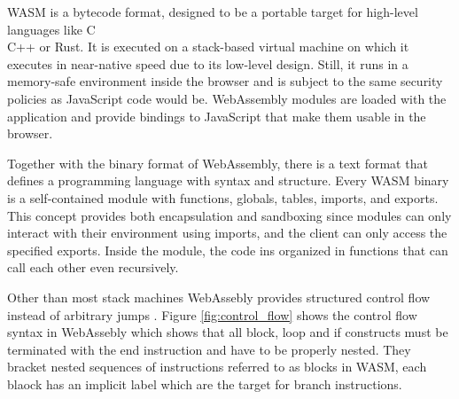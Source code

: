 WASM is a bytecode format, designed to be a portable target for high-level languages like C\\C++ or Rust. It is executed on a stack-based virtual machine on which it executes in near-native speed due to its low-level design. Still, it runs in a memory-safe environment inside the browser and is subject to the same security policies as JavaScript code would be. WebAssembly modules are loaded with the application and provide bindings to JavaScript that make them usable in the browser.

Together with the binary format of WebAssembly, there is a text format that defines a programming language with syntax and structure. Every WASM binary is a self-contained module with functions, globals, tables, imports, and exports. This concept provides both encapsulation and sandboxing since modules can only interact with their environment using imports, and the client can only access the specified exports. Inside the module, the code ins organized in functions that can call each other even recursively.

Other than most stack machines WebAssebly provides structured control flow instead of arbitrary jumps \autocite{noauthor_instructions_nodate}. Figure \ref{fig:control_flow} shows the control flow syntax in WebAssebly which shows that all block, loop and if constructs must be terminated with the end instruction and have to be properly nested. They bracket nested sequences of instructions referred to as blocks in WASM, each blaock has an implicit label which are the target for branch instructions.

